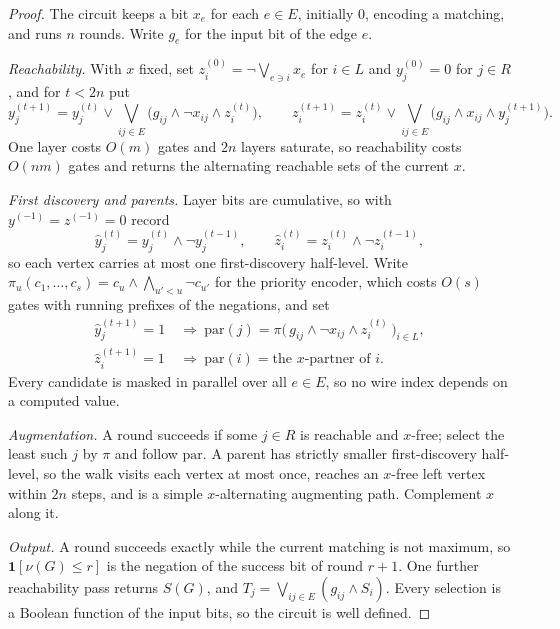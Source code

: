 \documentclass[11pt]{article}
\begin{document}
\begin{proof}
The circuit keeps a bit $x_e$ for each $e\in E$, initially $0$, encoding a
matching, and runs $n$ rounds.  Write $g_e$ for the input bit of the edge $e$.

\emph{Reachability.}  With $x$ fixed, set $z^{(0)}_i=\neg\bigvee_{e\ni i}x_e$ for
$i\in L$ and $y^{(0)}_j=0$ for $j\in R$, and for $t<2n$ put
\[
  y^{(t+1)}_j=y^{(t)}_j\vee\bigvee_{ij\in E}\bigl(g_{ij}\wedge\neg x_{ij}\wedge z^{(t)}_i\bigr),
  \qquad
  z^{(t+1)}_{i}=z^{(t)}_{i}\vee\bigvee_{ij\in E}\bigl(g_{ij}\wedge x_{ij}\wedge y^{(t+1)}_j\bigr).
\]
One layer costs $O(m)$ gates and $2n$ layers saturate, so reachability costs
$O(nm)$ gates and returns the alternating reachable sets of the current $x$.

\emph{First discovery and parents.}  Layer bits are cumulative, so with
$y^{(-1)}=z^{(-1)}=0$ record
\[
  \widehat y^{(t)}_j=y^{(t)}_j\wedge\neg y^{(t-1)}_j,
  \qquad
  \widehat z^{(t)}_i=z^{(t)}_i\wedge\neg z^{(t-1)}_i ,
\]
so each vertex carries at most one first-discovery half-level.  Write
$\pi_u(c_1,\ldots,c_s)=c_u\wedge\bigwedge_{u'<u}\neg c_{u'}$ for the priority
encoder, which costs $O(s)$ gates with running prefixes of the negations, and
set
\begin{align*}
  \widehat y^{(t+1)}_j=1
    &\ \Longrightarrow\
    \mathrm{par}(j)=\pi\bigl(\,g_{ij}\wedge\neg x_{ij}\wedge z^{(t)}_i\,\bigr)_{i\in L},\\
  \widehat z^{(t+1)}_i=1
    &\ \Longrightarrow\
    \mathrm{par}(i)=\text{the $x$-partner of $i$} .
\end{align*}
Every candidate is masked in parallel over all $e\in E$, so no wire index
depends on a computed value.

\emph{Augmentation.}  A round succeeds if some $j\in R$ is reachable and
$x$-free; select the least such $j$ by $\pi$ and follow $\mathrm{par}$.  A parent
has strictly smaller first-discovery half-level, so the walk visits each vertex
at most once, reaches an $x$-free left vertex within $2n$ steps, and is a simple
$x$-alternating augmenting path.  Complement $x$ along it.

\emph{Output.}  A round succeeds exactly while the current matching is not
maximum, so $\mathbf1[\nu(G)\le r]$ is the negation of the success bit of round
$r+1$.  One further reachability pass returns $S(G)$, and
$T_j=\bigvee_{ij\in E}(g_{ij}\wedge S_i)$.  Every selection is a Boolean
function of the input bits, so the circuit is well defined.


\end{proof}
\end{document}
